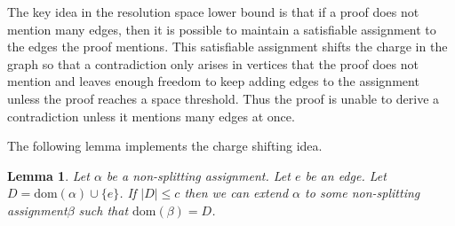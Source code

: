 \documentclass[11pt]{article}
\numberwithin{equation}{section}
\newtheorem{lemma}[theorem]{Lemma}
\theoremstyle{definition}
\theoremstyle{plain}
\theoremstyle{plain}
\theoremstyle{definition}
\newcommand{\domainof}[1]{\ensuremath{\mathrm{dom} ( #1 )}}
\newcommand{\set}[1]{\{ #1 \}}
\newcommand{\setsize}[1]{\lvert#1\rvert}
\newcommand{\union}{\cup}
\newcommand{\connectivityexpansionnot}{c}
\newcommand{\nonsplitting}{non-splitting\xspace}
\newcommand{\nonsplittingassignment}{\nonsplitting assignment\xspace}
\begin{document}
The key idea in the resolution space lower bound is that if a proof does not mention many edges, then it is possible to maintain a satisfiable assignment to the edges the proof mentions. This satisfiable assignment shifts the charge in the graph so that a contradiction only arises in vertices that the proof does not mention and leaves enough freedom to keep adding edges to the assignment unless the proof reaches a space threshold. Thus the proof is unable to derive a contradiction unless it mentions many edges at once.

The following lemma implements the charge shifting idea. 

\begin{lemma}
  \label{lem:extend-non-splitting}
  Let $\alpha$ be a \nonsplittingassignment. Let $e$ be an edge. Let $D=\domainof{\alpha}\union\set{e}$. If $\setsize{D}\leq \connectivityexpansionnot$ then we can extend $\alpha$ to some \nonsplittingassignment $\beta$ such that $\domainof{\beta}=D$.
\end{lemma}
\end{document}
